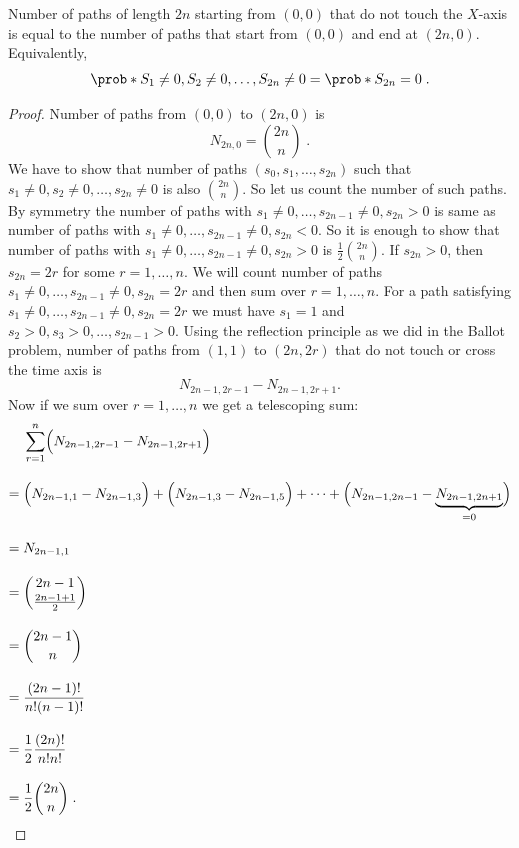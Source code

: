 \begin{theorem}

Number of paths of length $2n$ starting from $(0,0)$ that do not touch the $X$-axis is equal to the number of paths that start from $(0,0)$ and end at $(2n,0)$. Equivalently,
\[
\prob*{S_1\neq 0, S_2\neq 0,\ldots, S_{2n}\neq 0} = \prob*{S_{2n}=0}\;.
\]    
\end{theorem}

\begin{proof}
Number of paths from $(0,0)$ to $(2n,0)$ is 
\[
N_{2n,0}=\binom{2n}{n}\;.
\]
We have to show that number of paths $(s_0,s_1,\ldots,s_{2n})$ such that $s_1\neq 0,s_2\neq 0,\ldots,s_{2n}\neq 0$ is also $\binom{2n}{n}$. So let us count the number of such paths. By symmetry the number of paths with $s_1\neq 0,\ldots,s_{2n-1}\neq 0,s_{2n}>0$ is same as number of paths with $s_1\neq 0,\ldots,s_{2n-1}\neq 0,s_{2n}<0$. So it is enough to show that number of paths with $s_1\neq 0,\ldots,s_{2n-1}\neq 0,s_{2n}>0$ is $\frac{1}{2}\binom{2n}{n}$. If $s_{2n}>0$, then $s_{2n}=2r$ for some $r=1,\ldots,n$. We will count number of paths $s_1\neq 0,\ldots,s_{2n-1}\neq 0,s_{2n}=2r$ and then sum over $r=1,\ldots,n$. For a path satisfying $s_1\neq 0,\ldots,s_{2n-1}\neq 0,s_{2n}=2r$ we must have $s_1=1$ and $s_2>0,s_3>0,\ldots,s_{2n-1}>0$. Using the reflection principle as we did in the Ballot problem, number of paths from $(1,1)$ to $(2n,2r)$ that do not touch or cross the time axis is 
\[
N_{2n-1,2r-1}-N_{2n-1,2r+1}.
\]
Now if we sum over $r=1,\ldots,n$ we get a telescoping sum:
\begin{align*}
& \sum_{r=1}^{n} \Bigl( N_{2n-1,2r-1}-N_{2n-1,2r+1} \Bigr) \\[1em]
={} & \Bigl(N_{2n-1,1}-N_{2n-1,3}\Bigr)
+ \Bigl(N_{2n-1,3}-N_{2n-1,5}\Bigr)
+ \cdots + 
\Bigl( N_{2n-1,2n-1} - \underbrace{N_{2n-1,2n+1}}_{=0}\Bigr) \\[1em]
={} & N_{2n-1,1} \\[1em]
={} & \binom{2n-1}{\frac{2n-1+1}{2}} \\[1em]
={} & \binom{2n-1}{n} \\[1em]
={} & \frac{(2n-1)!}{n!(n-1)!} \\[1em]
={} & \frac{1}{2}\frac{(2n)!}{n!n!}\\[1em]
={} & \frac{1}{2}\binom{2n}{n}\;.
\end{align*}
\end{proof}

\newpage


